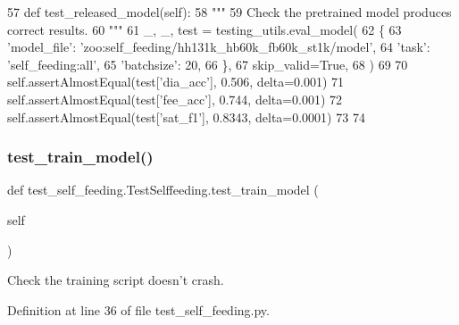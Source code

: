 \begin{DoxyCode}
57     \textcolor{keyword}{def }test\_released\_model(self):
58         \textcolor{stringliteral}{"""}
59 \textcolor{stringliteral}{        Check the pretrained model produces correct results.}
60 \textcolor{stringliteral}{        """}
61         \_, \_, test = testing\_utils.eval\_model(
62             \{
63                 \textcolor{stringliteral}{'model\_file'}: \textcolor{stringliteral}{'zoo:self\_feeding/hh131k\_hb60k\_fb60k\_st1k/model'},
64                 \textcolor{stringliteral}{'task'}: \textcolor{stringliteral}{'self\_feeding:all'},
65                 \textcolor{stringliteral}{'batchsize'}: 20,
66             \},
67             skip\_valid=\textcolor{keyword}{True},
68         )
69 
70         self.assertAlmostEqual(test[\textcolor{stringliteral}{'dia\_acc'}], 0.506, delta=0.001)
71         self.assertAlmostEqual(test[\textcolor{stringliteral}{'fee\_acc'}], 0.744, delta=0.001)
72         self.assertAlmostEqual(test[\textcolor{stringliteral}{'sat\_f1'}], 0.8343, delta=0.0001)
73 
74 
\end{DoxyCode}
\mbox{\label{classtest__self__feeding_1_1TestSelffeeding_a98171dd8471ea27cf898db407bae5ef8}} 
\subsubsection{\texorpdfstring{test\+\_\+train\+\_\+model()}{test\_train\_model()}}
{\footnotesize\ttfamily def test\+\_\+self\+\_\+feeding.\+Test\+Selffeeding.\+test\+\_\+train\+\_\+model (\begin{DoxyParamCaption}\item[{}]{self }\end{DoxyParamCaption})}

\begin{DoxyVerb}Check the training script doesn't crash.
\end{DoxyVerb}
 

Definition at line 36 of file test\+\_\+self\+\_\+feeding.\+py.



